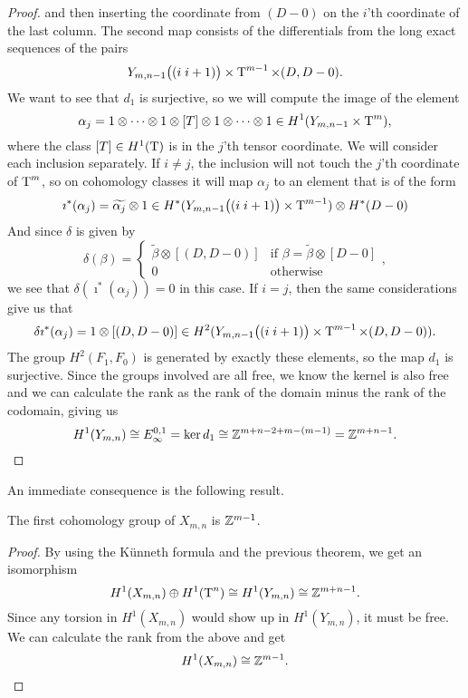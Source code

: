 \begin{proof}
  and then inserting the coordinate from $(D-0)$ on the $i$'th
  coordinate of the last column.
  The second map consists of the differentials from the long exact
  sequences of the pairs
  \[ Y_{m,n-1}\big((i\; i+1)\big) \times \operatorname{T}^{m-1}\times (D,D-0). \]
  We want to see that $d_1$ is surjective, so we will compute the
  image of the element 
  \[ \alpha_j = 1\otimes\dots\otimes 1\otimes [T] \otimes 1 \otimes
  \dots
  \otimes 1 \in H^1(Y_{m,n-1}\times \operatorname{T}^{m}),\] 
  where the class $[T]\in H^1(\operatorname{T})$ is in the $j$'th tensor coordinate.
  We will consider each inclusion separately. If $i \neq j$, the
  inclusion will not touch the $j$'th coordinate of $\operatorname{T}^m$, so on
  cohomology classes it will map $\alpha_j$ to an element that is of
  the form
  \[ \imath^*(\alpha_j) = \widetilde{\alpha_j}\otimes 1 \in
  H^*(Y_{m,n-1}\big((i\; i+1) \big) \times \operatorname{T}^{m-1}) \otimes
  H^*(D-0) \]
  And since $\delta$ is given by 
  \[ \delta(\beta) =
  \begin{cases}
    \widetilde{\beta}\otimes [(D,D-0)] & \text{if } \beta =
    \widetilde{\beta}\otimes [D-0] \\
    0 & \text{otherwise}
  \end{cases}, \]
  we see that $\delta(\imath^*(\alpha_j)) = 0$ in this case. If $i =
  j$, then the same considerations give us that
  \[ \delta\imath^*(\alpha_j) = 1 \otimes [(D,D-0)] \in
  H^2(Y_{m,n-1}\big((i\; i+1) \big) \times \operatorname{T}^{m-1}\times (D,D-0)). \]
  The group $H^2(F_1,F_0)$ is generated by exactly these elements, so
  the map $d_1$ is surjective. Since the groups involved are all free,
  we know the kernel is also free and we can calculate the rank as the
  rank of the domain minus the rank of the codomain, giving us
  \[ H^1(Y_{m,n}) \cong E_{\infty}^{0,1} = \ker d_1 \cong
  \mathbb{Z}^{m+n-2+m-(m-1)} = \mathbb{Z}^{m+n-1}. \]
\end{proof}

An immediate consequence is the following result.

\begin{corollary}
  \label{cor:1-kohom}
  The first cohomology group of $X_{m,n}$ is $\mathbb{Z}^{m-1}$.
\end{corollary}
\begin{proof}
  By using the K\"unneth formula and the previous theorem, we get an
  isomorphism
  \[ H^1(X_{m,n}) \oplus H^1(\operatorname{T}^n) \cong  H^1(Y_{m,n}) \cong
  \mathbb{Z}^{m+n-1}. \]
  Since any torsion in $H^1(X_{m,n})$ would show up in $H^1(Y_{m,n})$,
  it must be free. We can calculate the rank from the above and get
  \[ H^1(X_{m,n}) \cong \mathbb{Z}^{m-1}. \]
\end{proof}


